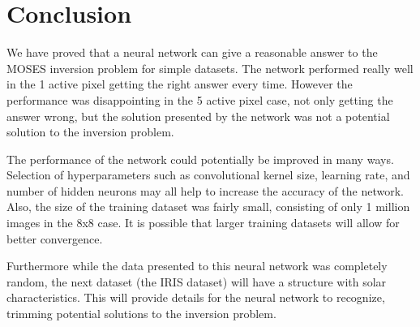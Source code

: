 \documentclass[twoside]{article}
\begin{document}
\section{Conclusion}

We have proved that a neural network can give a reasonable answer to the MOSES inversion problem for simple datasets.  The network performed really well in the 1 active pixel getting the right answer every time. However the performance was disappointing in the 5 active pixel case, not only getting the answer wrong, but the solution presented by the network was not a potential solution to the inversion problem. \par The performance of the network could potentially be improved in many ways. Selection of hyperparameters such as convolutional kernel size, learning rate, and number of hidden neurons may all help to increase the accuracy of the network. Also, the size of the training dataset was fairly small, consisting of only 1 million images in the 8x8 case. It is possible that larger training datasets will allow for better convergence. \par Furthermore while the data presented to this neural network was completely random, the next dataset (the IRIS dataset) will have a structure with solar characteristics. This will provide details for the neural network to recognize, trimming potential solutions to the inversion problem.

	
	
\end{document}

